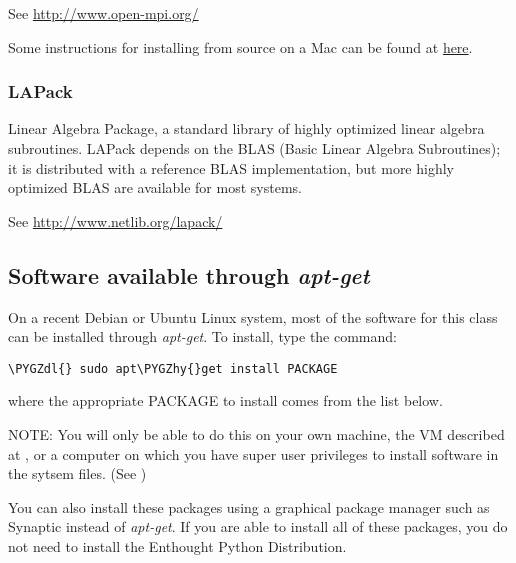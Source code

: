 \documentclass[letterpaper,10pt,english]{sphinxmanual}
\def\PYGZdl{\char`\$}
\def\PYGZhy{\char`\-}
\begin{document}
See \url{http://www.open-mpi.org/}

Some instructions for installing from source on a Mac can be found at
\href{https://sites.google.com/site/dwhipp/tutorials/installing-open-mpi-on-mac-os-x}{here}.


\subsubsection{LAPack}
\label{software_installation:lapack}\label{software_installation:installing-lapack}
Linear Algebra Package, a standard library of highly optimized linear
algebra subroutines.  LAPack depends on the BLAS (Basic Linear Algebra
Subroutines); it is distributed with a reference BLAS implementation,
but more highly optimized BLAS are available for most systems.

See \url{http://www.netlib.org/lapack/}


\subsection{Software available through \emph{apt-get}}
\label{software_installation:apt-get}\label{software_installation:software-available-through-apt-get}
On a recent Debian or Ubuntu Linux system, most of the software for
this class can be installed through \emph{apt-get}.  To install, type the
command:

\begin{Verbatim}[commandchars=\\\{\}]
\PYGZdl{} sudo apt\PYGZhy{}get install PACKAGE
\end{Verbatim}

where the appropriate PACKAGE to install comes from the list below.

NOTE: You will only be able to do this on your own machine, the VM described
at {\hyperref[vm:vm]{}}, or a computer on which you have super user privileges to
install software in the sytsem files.  (See {\hyperref[unix:sudo]{}})

You can also install
these packages using a graphical package manager such as Synaptic
instead of \emph{apt-get}.  If you are able to install all of these
packages, you do not need to install the Enthought Python
Distribution.
\end{document}
